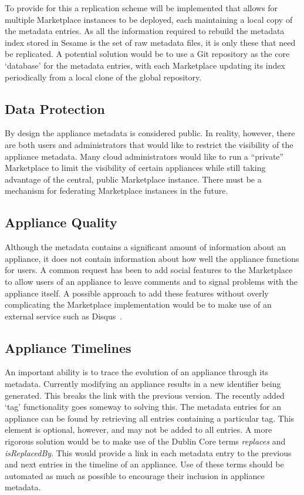 To provide for this a replication scheme will be implemented that  
allows for multiple Marketplace instances to be deployed, each maintaining a 
local copy of the metadata entries. As all the information required 
to rebuild the metadata index stored in Sesame is the set of raw metadata 
files, it is only these that need be replicated.  A potential solution would 
be to use a Git repository as the core `database' for the
metadata entries, with each Marketplace updating its index 
periodically from a local clone of the global repository.

\subsection{Data Protection}

By design the appliance metadata is considered public.  In reality,
however, there are both users and administrators that would like to
restrict the visibility of the appliance metadata.  Many cloud
administrators would like to run a ``private'' Marketplace to limit
the visibility of certain appliances while still taking advantage of
the central, public Marketplace instance.  There must be a mechanism
for federating Marketplace instances in the future. 

\subsection{Appliance Quality}

Although the metadata contains a significant amount of information
about an appliance, it does not contain information about how well the
appliance functions for users.  A common request has been to add
social features to the Marketplace to allow users of an appliance
to leave comments and to signal problems with the appliance itself.  
A possible approach to add these features without overly complicating 
the Marketplace implementation would be to make use of an external service 
such as Disqus~\cite{disqus}.

\subsection{Appliance Timelines}

An important ability is to trace the evolution of an appliance through its
metadata. Currently modifying an appliance results in a new identifier 
being generated. This breaks the link with the previous version. The recently added 
`tag' functionality goes someway to solving this.  The metadata entries for 
an appliance can be found by retrieving all entries
containing a particular tag. This element is optional, however, and
may not be added to all entries. A more rigorous solution would be to
make use of the Dublin Core terms \emph{replaces} and \emph{isReplacedBy}. This
would provide a link in each metadata entry to the previous and next
entries in the timeline of an appliance. Use of these terms should be 
automated as much as possible to encourage their inclusion in appliance metadata.
